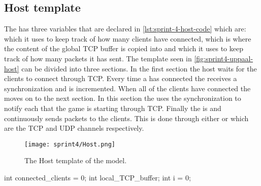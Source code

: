 \subsection*{Host template}
The  has three variables that are declared in \autoref{lst:sprint-4-host-code} which are:
 which it uses to keep track of how many clients have connected,  which is where the content of the global TCP buffer is copied into and  which it uses to keep track of how many packets it has sent. 
The template seen in \autoref{fig:sprint4-uppaal-host} can be divided into three sections.
In the first section the host waits for the clients to connect through TCP.
Every time a  has connected the  receives a  synchronization and  is incremented.
When all of the clients have connected the  moves on to the next section.
In this section the  uses the  synchronization to notify each  that the game is starting through TCP.
Finally the  is  and continuously sends packets to the clients.
This is done through either  or  which are the TCP and UDP channels respectively.
\begin{figure}[h]
    \centering
    \texttt{[image: sprint4/Host.png]}
    \caption{The Host template of the \uppaal model.}
    \label{fig:sprint4-uppaal-host}
\end{figure}

\begin{uppaalcode}[caption={local Host declarations}, label={lst:sprint-4-host-code},captionpos=b]
int connected_clients = 0;
int local_TCP_buffer;
int i = 0;
\end{uppaalcode}


